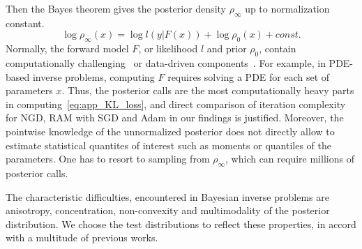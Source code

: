 \documentclass{article} %
\numberwithin{equation}{subsection}
\numberwithin{theorem}{section}
\newcommand{\cN}{\mathcal{N}}
\begin{document}
    Then the Bayes theorem gives the posterior density $\rho_\infty$ up to normalization constant.
    \[
        \log\rho_\infty(x) = \log l(y|F(x)) + \log\rho_0(x) + const.
    \]
    Normally, the forward model $F$, or likelihood $l$ and prior $\rho_0$, contain computationally challenging~\cite{bui2013computational,petra2014computational,dinkel2024solving, cockayne2017probabilistic,aghanim2020planck} or data-driven components~\cite{liu2024population}.
    For example, in PDE-based inverse problems, computing $F$ requires solving a PDE for each set of parameters $x$.
    Thus, the posterior calls  are the most computationally heavy parts in computing~\eqref{eq:app_KL_loss}, and direct comparison of iteration complexity for NGD, RAM with SGD and Adam in our findings is justified.
    Moreover, the pointwise knowledge of the unnormalized posterior does not directly allow to estimate statistical quantites of interest such as moments or quantiles of the parameters.
    One has to resort to sampling from $\rho_\infty$, which can require millions of posterior calls.
    
    
    The characteristic difficulties, encountered in Bayesian inverse problems are anisotropy, concentration, non-convexity and multimodality of the posterior distribution. 
    We choose the test distributions to reflect these properties, in accord with a multitude of previous works.
\end{document}

